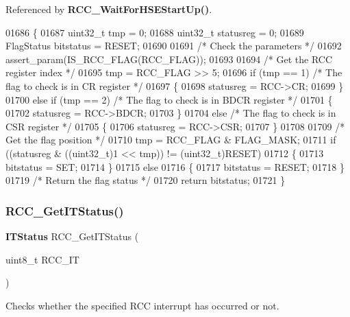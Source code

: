 Referenced by \textbf{ R\+C\+C\+\_\+\+Wait\+For\+H\+S\+E\+Start\+Up()}.


\begin{DoxyCode}
01686 \{
01687   uint32\_t tmp = 0;
01688   uint32\_t statusreg = 0;
01689   FlagStatus bitstatus = RESET;
01690 
01691   \textcolor{comment}{/* Check the parameters */}
01692   assert_param(IS_RCC_FLAG(RCC\_FLAG));
01693 
01694   \textcolor{comment}{/* Get the RCC register index */}
01695   tmp = RCC\_FLAG >> 5;
01696   \textcolor{keywordflow}{if} (tmp == 1)               \textcolor{comment}{/* The flag to check is in CR register */}
01697   \{
01698     statusreg = RCC->CR;
01699   \}
01700   \textcolor{keywordflow}{else} \textcolor{keywordflow}{if} (tmp == 2)          \textcolor{comment}{/* The flag to check is in BDCR register */}
01701   \{
01702     statusreg = RCC->BDCR;
01703   \}
01704   \textcolor{keywordflow}{else}                       \textcolor{comment}{/* The flag to check is in CSR register */}
01705   \{
01706     statusreg = RCC->CSR;
01707   \}
01708 
01709   \textcolor{comment}{/* Get the flag position */}
01710   tmp = RCC\_FLAG & FLAG_MASK;
01711   \textcolor{keywordflow}{if} ((statusreg & ((uint32\_t)1 << tmp)) != (uint32\_t)RESET)
01712   \{
01713     bitstatus = SET;
01714   \}
01715   \textcolor{keywordflow}{else}
01716   \{
01717     bitstatus = RESET;
01718   \}
01719   \textcolor{comment}{/* Return the flag status */}
01720   \textcolor{keywordflow}{return} bitstatus;
01721 \}
\end{DoxyCode}
\mbox{\label{group__RCC__Group4_ga6126c99f398ee4be410ad76ae3aee18f}} 
\subsubsection{R\+C\+C\+\_\+\+Get\+I\+T\+Status()}
{\footnotesize\ttfamily \textbf{ I\+T\+Status} R\+C\+C\+\_\+\+Get\+I\+T\+Status (\begin{DoxyParamCaption}\item[{uint8\+\_\+t}]{R\+C\+C\+\_\+\+IT }\end{DoxyParamCaption})}



Checks whether the specified R\+CC interrupt has occurred or not. 


